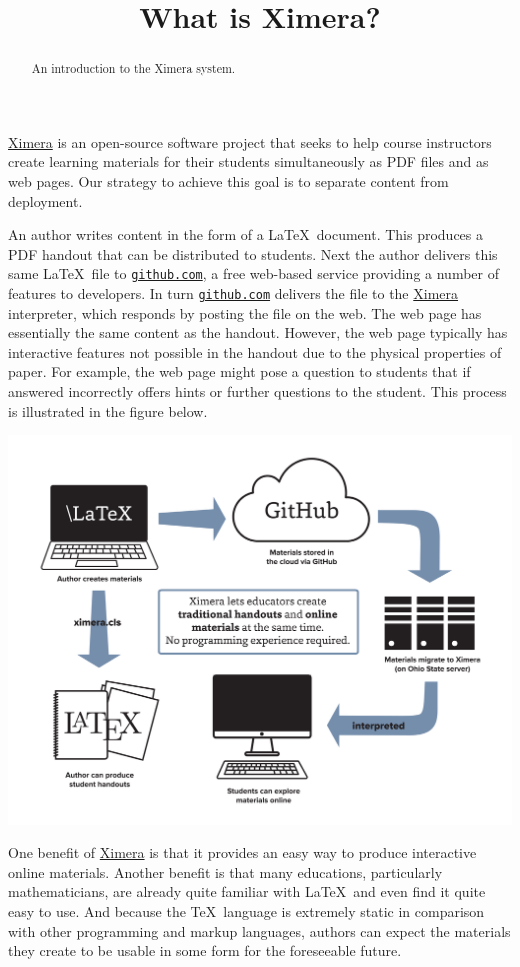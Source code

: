 \documentclass{ximera}
\title{What is Ximera?}
\begin{document}
\begin{abstract}
An introduction to the Ximera system.
\end{abstract}
\maketitle

\href{http://ximera.osu.edu}{\sf Ximera}
is an open-source software project that
seeks to help course instructors create learning materials
for their students simultaneously as PDF files and as web pages.
Our strategy to achieve this goal is to separate
content from deployment.

An author writes content in the form of a \LaTeX\ document.
This produces a PDF handout that can be distributed to students.
Next the author delivers this same \LaTeX\ file to
\href{http://github.com}{\tt github.com},
a free web-based service providing a number of features to developers.
In turn \href{http://github.com}{\tt github.com} delivers
the file to the \href{http://ximera.osu.edu}{\sf Ximera}
interpreter, which responds by posting the file on the web.
The web page has essentially the same content as the handout.
However, the web page typically has interactive features
not possible in the handout due to the physical properties of paper.
For example, the web page might pose a question to students
that if answered incorrectly offers hints or further questions
to the student.
This process is illustrated in the figure below.

\begin{image}
\includegraphics[scale=.25]{XimeraGraphic.png}
\end{image}

One benefit of \href{http://ximera.osu.edu}{\sf Ximera}
is that it provides an easy way to produce interactive online materials.
Another benefit is that many educations, particularly mathematicians,
are already quite familiar with \LaTeX\ and
even find it quite easy to use.
And because the \TeX\ language is extremely static in comparison with
other programming and markup languages, authors can expect
the materials they create to be usable in some
form for the foreseeable future.
\end{document}

